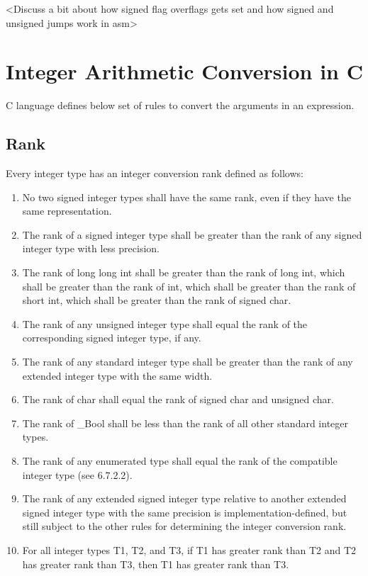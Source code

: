 \documentclass{article}
\begin{document}
<Discuss a bit about how signed flag overflags gets set and how signed and
unsigned jumps work in asm>


\section{Integer Arithmetic Conversion in C}
C language defines below set of rules to convert the arguments in an expression.

\subsection{Rank}
Every integer type has an integer conversion rank defined as follows:
\begin{enumerate}[noitemsep]
    \item No two signed integer types shall have the same rank, even if they have the same
    representation.
    \item The rank of a signed integer type shall be greater than the rank of any signed integer
    type with less precision.
    \item The rank of long long int shall be greater than the rank of long int, which
    shall be greater than the rank of int, which shall be greater than the rank of short
    int, which shall be greater than the rank of signed char.
    \item The rank of any unsigned integer type shall equal the rank of the corresponding
    signed integer type, if any.
    \item The rank of any standard integer type shall be greater than the rank of any extended
    integer type with the same width.
    \item The rank of char shall equal the rank of signed char and unsigned char.
    \item The rank of \_Bool shall be less than the rank of all other standard integer types.
    \item The rank of any enumerated type shall equal the rank of the compatible integer type
    (see 6.7.2.2).
    \item The rank of any extended signed integer type relative to another extended signed
    integer type with the same precision is implementation-defined, but still subject to the
    other rules for determining the integer conversion rank.
    \item For all integer types T1, T2, and T3, if T1 has greater rank than T2 and T2 has
    greater rank than T3, then T1 has greater rank than T3.
\end{enumerate}
\end{document}
